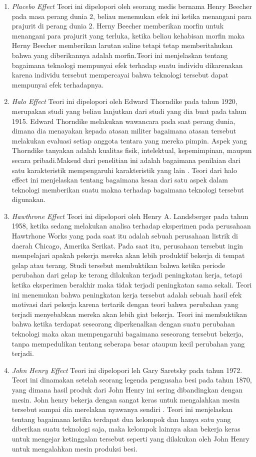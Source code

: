	\begin{enumerate}
		\item \textit{Placebo Effect}
			\subitem Teori ini dipelopori oleh seorang medis bernama Henry Beecher pada masa perang dunia 2, beliau menemukan efek ini ketika menangani para prajurit di perang dunia 2. Herny Beecher memberikan morfin untuk menangani para prajurit yang terluka, ketika beliau kehabisan morfin maka Herny Beecher memberikan larutan saline tetapi tetap memberitahukan bahwa yang diberikannya adalah morfin.Teori ini menjelaskan tentang bagaimana teknologi mempunyai efek terhadap suatu individu dikarenakan karena individu tersebut mempercayai bahwa teknologi tersebut dapat mempunyai efek terhadapnya.
		\item \textit{Halo Effect}
			\subitem Teori ini dipelopori oleh Edward Thorndike pada tahun 1920, merupakan studi yang beliau lanjutkan dari studi yang dia buat pada tahun 1915. Edward Thorndike melakukan wawancara pada saat perang dunia, dimana dia menayakan kepada atasan militer bagaimana atasan tersebut melakukan evaluasi setiap anggota tentara yang mereka pimpin. Aspek yang Thorndike tanyakan adalah kualitas fisik, intelektual, kepemimpinan, maupun secara pribadi.Maksud dari penelitian ini adalah bagaimana penilaian dari satu karakteristik mempengaruhi karakteristik yang lain . Teori dari halo effect ini menjelaskan tentang bagaimana kesan dari satu aspek dalam teknologi memberikan suatu makna terhadap bagaimana teknologi tersebut digunakan.
		\item \textit{Hawthrone Effect}
			\subitem Teori ini dipelopori oleh Henry A. Landsberger pada tahun 1958, ketika sedang melakukan analisa terhadap eksperimen pada perusahaan Hawtrhone Works yang pada saat itu adalah sebuah perusahaan listrik di daerah Chicago, Amerika Serikat. Pada saat itu, perusahaan tersebut ingin mempelajari apakah pekerja mereka akan lebih produktif bekerja di tempat gelap atau terang. Studi tersebut membuktikan bahwa ketika periode perubahan dari gelap ke terang dilakukan terjadi peningkatan kerja, tetapi ketika eksperimen berakhir maka tidak terjadi peningkatan sama sekali. Teori ini menemukan bahwa peningkatan kerja tersebut adalah sebuah hasil efek motivasi dari pekerja karena tertarik dengan teori bahwa perubahan yang terjadi menyebabkan mereka akan lebih giat bekerja. Teori ini membuktikan bahwa ketika terdapat seseorang diperkenalkan dengan suatu perubahan teknologi maka akan mempengaruhi bagaimana seseorang tersebut bekerja, tanpa mempedulikan tentang seberapa besar ataupun kecil perubahan yang terjadi.
		\item \textit{John Henry Effect}
			\subitem Teori ini dipelopori leh Gary Saretsky pada tahun 1972. Teori ini dinamakan setelah seorang legenda pengusaha besi pada tahun 1870, yang dimana hasil produk dari John Henry ini sering dibandingkan dengan mesin. John henry bekerja dengan sangat keras untuk mengalahkan mesin tersebut sampai dia merelakan nyawanya sendiri . Teori ini menjelaskan tentang bagaimana ketika terdapat dua kelompok dan hanya satu yang diberikan suatu teknologi saja, maka kelompok lainnya akan bekerja keras untuk mengejar ketinggalan tersebut seperti yang dilakukan oleh John Henry untuk mengalahkan mesin produksi besi.
	\end{enumerate}
